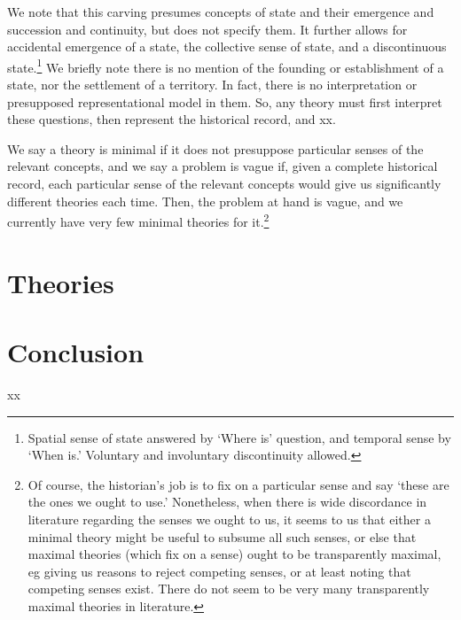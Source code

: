	We note that this carving presumes concepts of state and their emergence and succession and continuity, but does not specify them. It further allows for accidental emergence of a state, the collective sense of state, and a discontinuous state.\footnote{Spatial sense of state answered by `Where is' question, and temporal sense by `When is.' Voluntary and involuntary discontinuity allowed.} We briefly note there is no mention of the founding or establishment of a state, nor the settlement of a territory. In fact, there is no interpretation or presupposed representational model in them. So, any theory must first interpret these questions, then represent the historical record, and xx.
	
	We say a theory is minimal if it does not presuppose particular senses of the relevant concepts, and we say a problem is vague if, given a complete historical record, each particular sense of the relevant concepts would give us significantly different theories each time. Then, the problem at hand is vague, and we currently have very few minimal theories for it.\footnote{Of course, the historian's job is to fix on a particular sense and say `these are the ones we ought to use.' Nonetheless, when there is wide discordance in literature regarding the senses we ought to us, it seems to us that either a minimal theory might be useful to subsume all such senses, or else that maximal theories (which fix on a sense) ought to be transparently maximal, eg giving us reasons to reject competing senses, or at least noting that competing senses exist. There do not seem to be very many transparently maximal theories in literature.}
%
%
%
\section{Theories}
\label{s:theories}
%
%
%
\section{Conclusion}
\label{s:concl}
	xx
%
%
%
